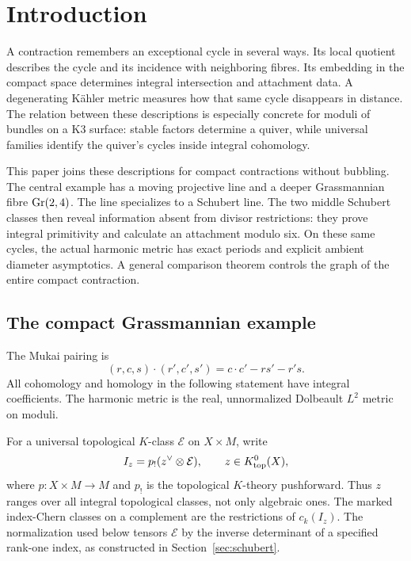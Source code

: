 \section{Introduction}

A contraction remembers an exceptional cycle in several ways.
Its local quotient describes the cycle and its incidence with
neighboring fibres. Its embedding in the compact space determines
integral intersection and attachment data. A degenerating Kähler
metric measures how that same cycle disappears in distance.
The relation between these descriptions is especially concrete
for moduli of bundles on a K3 surface: stable factors determine
a quiver, while universal families identify the quiver's cycles
inside integral cohomology.

This paper joins these descriptions for compact contractions
without bubbling. The central example has a moving projective
line and a deeper Grassmannian fibre \(\operatorname{Gr}(2,4)\).
The line specializes to a Schubert line. The two middle
Schubert classes then reveal information absent from divisor
restrictions: they prove integral primitivity and calculate an
attachment modulo six. On these same cycles, the actual
harmonic metric has exact periods and explicit ambient diameter
asymptotics. A general comparison theorem controls the graph
of the entire compact contraction.

\subsection{The compact Grassmannian example}
The Mukai pairing is
\[
 (r,c,s)\cdot(r',c',s')=c\cdot c'-rs'-r's .
\]
All cohomology and homology in the following statement have
integral coefficients. The harmonic metric is the real,
unnormalized Dolbeault \(L^2\) metric on moduli.

For a universal topological \(K\)-class \(\mathcal E\) on
\(X\times M\), write
\[
 I_z=p_!(z^\vee\otimes\mathcal E),\qquad z\in K^0_{\rm top}(X),
\]
where \(p:X\times M\to M\) and \(p_!\) is the topological
\(K\)-theory pushforward. Thus \(z\) ranges over all integral
topological classes, not only algebraic ones. The marked index-Chern
classes on a complement are the restrictions of \(c_k(I_z)\).
The normalization used below tensors \(\mathcal E\) by the inverse
determinant of a specified rank-one index, as constructed in
Section~\ref{sec:schubert}.

